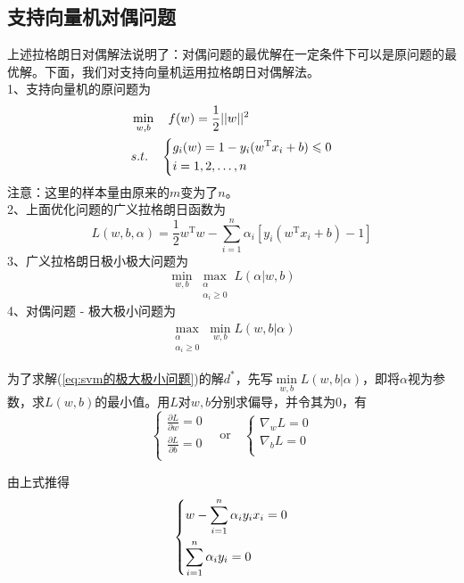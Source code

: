	\subsection{支持向量机对偶问题}
		\par
		上述拉格朗日对偶解法说明了：对偶问题的最优解在一定条件下可以是原问题的最优解。下面，我们对支持向量机运用拉格朗日对偶解法。\\
		1、支持向量机的原问题为
		\begin{align}
		\centering
		& \min_{w,b}\quad f(w)=\frac{1}{2}||w||^2\\
		& s.t.\quad
		\left\{
		\begin{aligned}
		& g_i(w)=1-y_i(w^ \mathrm{ T } x_i+b ) \leqslant 0 \notag\\
		& i =1,2,\dots,n \notag\\
		\end{aligned}
		\right.
		\end{align}
		注意：这里的样本量由原来的$m$变为了$n$。\\
		2、上面优化问题的广义拉格朗日函数为
		\[
		L(w,b,\alpha)=\frac{1}{2}w^\mathrm{T}w-\sum_{i=1}^n\alpha_i[y_i(w^\mathrm{T}x_i+b)-1]
		\]
		3、广义拉格朗日极小极大问题为
		\[
		\min_{w,b}\max_{\substack{\alpha \\ \alpha_i \geqslant 0}}L(\alpha|w,b)
		\]
		4、对偶问题 - 极大极小问题为
		\begin{align}\label{eq:svm的极大极小问题}
		\max_{\substack{\alpha \\ \alpha_i \geqslant 0}}\min_{w,b}L(w,b|\alpha)
		\end{align}
		\par
		为了求解(\ref{eq:svm的极大极小问题})的解$d^*$，先写$\min \limits_{w,b} L(w,b|\alpha)$，即将$\alpha$视为参数，求$L(w,b)$的最小值。用$L$对$w,b$分别求偏导，并令其为0，有
		\[
			\left\{
			\begin{aligned}
				\frac{\partial L}{\partial w} =0 \\
				\frac{\partial L}{\partial b} =0 \\
			\end{aligned}
			\right.
			\quad \text{or} \quad
			\left\{
			\begin{aligned}
				\nabla_{w}L = 0 \\
				\nabla_{b}L = 0 \\
			\end{aligned}
			\right.
		\]
		\par
		由上式推得
			\begin{equation}
			\label{eq:L求导结果}
			\centering
			\left\{\begin{lgathered}
			w-\sum_{i=1}^n\alpha_iy_ix_i=0\\
			\sum_{i=1}^n\alpha_iy_i=0\\
			\end{lgathered} \right.
			\end{equation}
